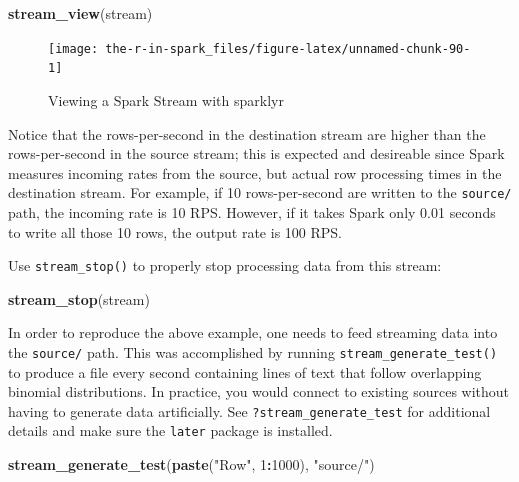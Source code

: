 \documentclass[]{book}
\newenvironment{Shaded}{\begin{snugshade}}{\end{snugshade}}
\newcommand{\DecValTok}[1]{\textcolor[rgb]{0.00,0.00,0.81}{#1}}
\newcommand{\KeywordTok}[1]{\textcolor[rgb]{0.13,0.29,0.53}{\textbf{#1}}}
\newcommand{\NormalTok}[1]{#1}
\newcommand{\OperatorTok}[1]{\textcolor[rgb]{0.81,0.36,0.00}{\textbf{#1}}}
\newcommand{\StringTok}[1]{\textcolor[rgb]{0.31,0.60,0.02}{#1}}
\theoremstyle{definition}
\theoremstyle{definition}
\theoremstyle{definition}
\theoremstyle{remark}
\begin{document}
\begin{Shaded}
\begin{Highlighting}[]
\KeywordTok{stream_view}\NormalTok{(stream)}
\end{Highlighting}
\end{Shaded}

\begin{figure}

{\centering \texttt{[image: the-r-in-spark\_files/figure-latex/unnamed-chunk-90-1]} 

}

\caption{Viewing a Spark Stream with sparklyr}\label{fig:unnamed-chunk-90}
\end{figure}

Notice that the rows-per-second in the destination stream are higher
than the rows-per-second in the source stream; this is expected and
desireable since Spark measures incoming rates from the source, but
actual row processing times in the destination stream. For example, if
10 rows-per-second are written to the \texttt{source/} path, the
incoming rate is 10 RPS. However, if it takes Spark only 0.01 seconds to
write all those 10 rows, the output rate is 100 RPS.

Use \texttt{stream\_stop()} to properly stop processing data from this
stream:

\begin{Shaded}
\begin{Highlighting}[]
\KeywordTok{stream_stop}\NormalTok{(stream)}
\end{Highlighting}
\end{Shaded}

In order to reproduce the above example, one needs to feed streaming
data into the \texttt{source/} path. This was accomplished by running
\texttt{stream\_generate\_test()} to produce a file every second
containing lines of text that follow overlapping binomial distributions.
In practice, you would connect to existing sources without having to
generate data artificially. See \texttt{?stream\_generate\_test} for
additional details and make sure the \texttt{later} package is
installed.

\begin{Shaded}
\begin{Highlighting}[]
\KeywordTok{stream_generate_test}\NormalTok{(}\KeywordTok{paste}\NormalTok{(}\StringTok{"Row"}\NormalTok{, }\DecValTok{1}\OperatorTok{:}\DecValTok{1000}\NormalTok{), }\StringTok{"source/"}\NormalTok{)}
\end{Highlighting}
\end{Shaded}
\end{document}
